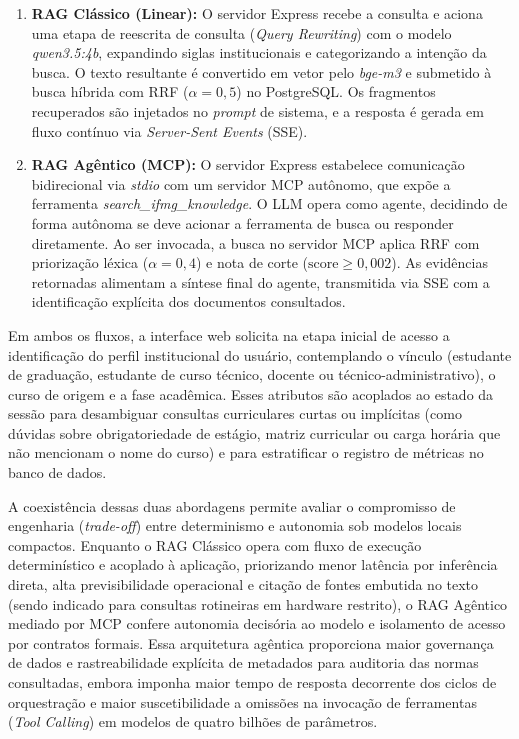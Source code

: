 \documentclass[12pt]{article}
\begin{document}
\begin{enumerate}
    \item \textbf{RAG Clássico (Linear):} O servidor Express recebe a consulta e aciona uma etapa de reescrita de consulta (\textit{Query Rewriting}) com o modelo \textit{qwen3.5:4b}, expandindo siglas institucionais e categorizando a intenção da busca. O texto resultante é convertido em vetor pelo \textit{bge-m3} e submetido à busca híbrida com RRF ($\alpha = 0,5$) no PostgreSQL. Os fragmentos recuperados são injetados no \textit{prompt} de sistema, e a resposta é gerada em fluxo contínuo via \textit{Server-Sent Events} (SSE).
    \item \textbf{RAG Agêntico (MCP):} O servidor Express estabelece comunicação bidirecional via \textit{stdio} com um servidor MCP autônomo, que expõe a ferramenta \textit{search\_ifmg\_knowledge}. O LLM opera como agente, decidindo de forma autônoma se deve acionar a ferramenta de busca ou responder diretamente. Ao ser invocada, a busca no servidor MCP aplica RRF com priorização léxica ($\alpha = 0,4$) e nota de corte ($\text{score} \ge 0,002$). As evidências retornadas alimentam a síntese final do agente, transmitida via SSE com a identificação explícita dos documentos consultados.
\end{enumerate}

Em ambos os fluxos, a interface web solicita na etapa inicial de acesso a identificação do perfil institucional do usuário, contemplando o vínculo (estudante de graduação, estudante de curso técnico, docente ou técnico-administrativo), o curso de origem e a fase acadêmica. Esses atributos são acoplados ao estado da sessão para desambiguar consultas curriculares curtas ou implícitas (como dúvidas sobre obrigatoriedade de estágio, matriz curricular ou carga horária que não mencionam o nome do curso) e para estratificar o registro de métricas no banco de dados.

A coexistência dessas duas abordagens permite avaliar o compromisso de engenharia (\textit{trade-off}) entre determinismo e autonomia sob modelos locais compactos. Enquanto o RAG Clássico opera com fluxo de execução determinístico e acoplado à aplicação, priorizando menor latência por inferência direta, alta previsibilidade operacional e citação de fontes embutida no texto (sendo indicado para consultas rotineiras em hardware restrito), o RAG Agêntico mediado por MCP confere autonomia decisória ao modelo e isolamento de acesso por contratos formais. Essa arquitetura agêntica proporciona maior governança de dados e rastreabilidade explícita de metadados para auditoria das normas consultadas, embora imponha maior tempo de resposta decorrente dos ciclos de orquestração e maior suscetibilidade a omissões na invocação de ferramentas (\textit{Tool Calling}) em modelos de quatro bilhões de parâmetros.
\end{document}
